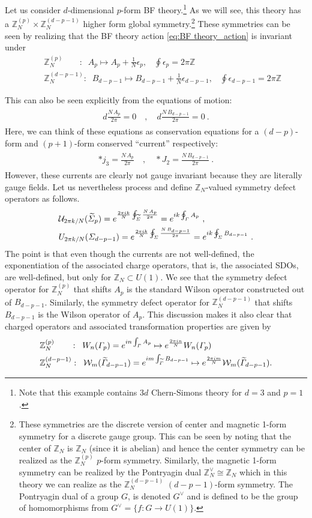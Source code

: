 \documentclass[11pt]{article}
\newcommand{\eq}[1]{\begin{align}\begin{split}#1\end{split}\end{align}}
\def\CW {{\cal W}}
\def\CU {{\cal U}}
\def\IZ{{\mathbb{Z}}}
\def\bea{\begin{eqnarray}}
\def\eea{\end{eqnarray}}
\begin{document}
Let us consider $d$-dimensional $p$-form BF theory.\footnote{Note that this example contains $3d$ Chern-Simons theory for $d=3$ and $p=1$.}
As we will see, this theory has a $\IZ_N^{(p)}\times \IZ_N^{(d-p-1)}$ higher form global symmetry.\footnote{
These symmetries are the discrete version of center and magnetic 1-form  symmetry for a discrete gauge group. This can be seen by noting  that the center of $\IZ_N$ is $\IZ_N$ (since it is abelian) and hence the center symmetry can be realized as the $\IZ_N^{(p)}$ $p$-form symmetry. Similarly, the  magnetic 1-form  symmetry can be realized by the Pontryagin dual
 $\IZ_N^\vee\cong \IZ_N$ which in this theory we can realize as the $\IZ_N^{(d-p-1)}$ $(d-p-1)$-form symmetry. The Pontryagin dual of a group $G$, is denoted $G^\vee$ and is defined to be the group of homomorphisms from $G^\vee=\{f:G\to U(1)\}$. } These symmetries can be seen by realizing that the BF theory action \eqref{eq:BF theory_action} is invariant under 
%
\bea
&& \IZ_N^{(p)} \;\;\;\;\;\;\; : \; \; A_p \longmapsto A_p + \frac{1}{N} \epsilon_p, \;\;\; \oint \epsilon_p = 2\pi \IZ \label{eq:BF_ZNp}\\
&& \IZ_N^{(d-p-1)} : \; \; B_{d-p-1} \longmapsto B_{d-p-1} + \frac{1}{N} \epsilon_{d-p-1}, \;\;\; \oint \epsilon_{d-p-1} = 2\pi \IZ \label{eq:BF_ZNdp1}
\eea
%

This can also be seen explicitly from the equations of motion: 
\eq{
d\frac{N\, A_p}{2\pi}=0\quad, \quad d\frac{N\, B_{d-p-1}}{2\pi}=0~.
}
Here, we can think of these equations as conservation equations for a $(d-p)$-form and $(p+1)$-form conserved ``current'' respectively:
\eq{
\ast j_3=\frac{N\,A_p}{2\pi}\quad, \quad \ast J_2=\frac{N\,B_{d-p-1}}{2\pi}~.
}
However, these currents are clearly not gauge invariant because they are literally gauge fields. 
Let us nevertheless process and define  $\IZ_N$-valued symmetry defect operators as follows.
%
\eq{
&\CU_{2\pi k/N}(\widetilde\Sigma_p)=e^{\frac{2\pi i k}{N}\oint_{\widetilde\Sigma} \frac{N\,A_p}{2\pi} }=e^{i k \oint_\Gamma A_p} ~,\\
&U_{2\pi k/N}(\Sigma_{d-p-1})=e^{\frac{2\pi i k}{N}\oint_\Sigma \frac{N\,B_{d-p-1}}{2\pi}}=e^{i k \oint_\Sigma B_{d-p-1}}~.
}
%
The point is that even though the currents are not well-defined, the exponentiation of the associated charge operators, that is, the associated SDOs, are well-defined, but only for $\IZ_N \subset U(1)$.  
We see that the symmetry defect operator for $\IZ_N^{(p)}$ that shifts $A_p$ is the standard Wilson operator constructed out of $B_{d-p-1}$. Similarly, the symmetry defect operator for $\IZ_N^{(d-p-1)}$ that shifts $B_{d-p-1}$ is the Wilson operator of $A_p$. This discussion makes it also clear that charged operators and associated transformation properties are given by
%
%
\eq{
& \IZ_N^{(p)} \;\;\;\;\;\;\; : \; \; W_n(\Gamma_p)=e^{i n \int_{\Gamma} A_p} \mapsto e^{\frac{2\pi i n}{N}} W_n (\Gamma_p) \\
& \IZ_N^{(d-p-1)} : \; \;  \CW_m(\widetilde\Gamma_{d-p-1})=e^{i m \int_{\widetilde\Gamma} B_{d-p-1}} \mapsto e^{\frac{2\pi i m}{N}} \CW_m(\widetilde\Gamma_{d-p-1}).
}
%
 
\end{document}
